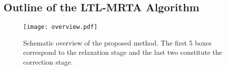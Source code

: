 \documentclass[Afour,sageh,times]{sagej}
\newcommand{\ltl}{ {\it LTL}$_{-\bigcirc}$ }
\begin{document}
\subsection{Outline of the LTL-MRTA Algorithm}
 \begin{figure*}[!t]
   \centering
\texttt{[image: overview.pdf]}
   \caption{Schematic overview of the proposed method.  The first 5 boxes correspond to the relaxation stage and the last two constitute the correction stage.}
\label{fig:overview}
 \end{figure*}
\end{document}
